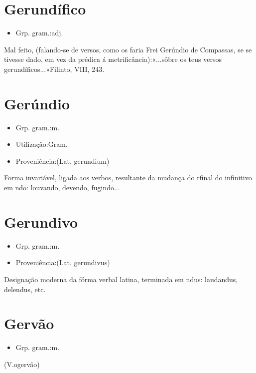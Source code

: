 \section{Gerundífico}
\begin{itemize}
\item {Grp. gram.:adj.}
\end{itemize}
Mal feito, (falando-se de versos, como os faria Frei Gerúndio de Compassas, se se tivesse dado, em vez da prédica á metrificância):«\textunderscore ...sôbre os teus versos gerundíficos...\textunderscore »Filinto, VIII, 243.
\section{Gerúndio}
\begin{itemize}
\item {Grp. gram.:m.}
\end{itemize}
\begin{itemize}
\item {Utilização:Gram.}
\end{itemize}
\begin{itemize}
\item {Proveniência:(Lat. \textunderscore gerundium\textunderscore )}
\end{itemize}
Forma invariável, ligada aos verbos, resultante da mudança do \textunderscore r\textunderscore  final do infinitivo em \textunderscore ndo\textunderscore : \textunderscore louvando\textunderscore , \textunderscore devendo\textunderscore , \textunderscore fugindo...\textunderscore 
\section{Gerundivo}
\begin{itemize}
\item {Grp. gram.:m.}
\end{itemize}
\begin{itemize}
\item {Proveniência:(Lat. \textunderscore gerundivus\textunderscore )}
\end{itemize}
Designação moderna da fórma verbal latina, terminada em \textunderscore ndus\textunderscore : \textunderscore laudandus\textunderscore , \textunderscore delendus\textunderscore , etc.
\section{Gervão}
\begin{itemize}
\item {Grp. gram.:m.}
\end{itemize}
(V.ogervão)
